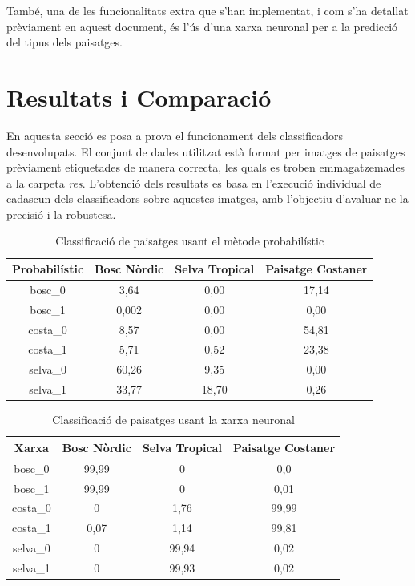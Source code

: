 \documentclass{ieeetj}
\begin{document}
També, una de les funcionalitats extra que s'han implementat, i com s'ha detallat prèviament en aquest document, és l'ús d'una xarxa neuronal per a la predicció del tipus dels paisatges.


\section{Resultats i Comparació} 
En aquesta secció es posa a prova el funcionament dels classificadors desenvolupats. El conjunt de dades utilitzat està format per imatges de paisatges prèviament etiquetades de manera correcta, les quals es troben emmagatzemades a la carpeta \textit{res}. L'obtenció dels resultats es basa en l'execució individual de cadascun dels classificadors sobre aquestes imatges, amb l'objectiu d'avaluar-ne la precisió i la robustesa.

\begin{table}[H]
\centering
\caption{Classificació de paisatges usant el mètode probabilístic}
\label{tab:clasificacion}
\begin{tabular}{|c|c|c|c|}
\hline
\textbf{Probabilístic} & \textbf{Bosc Nòrdic} & \textbf{Selva Tropical} & \textbf{Paisatge Costaner} \\
\hline
bosc\_0  & 3,64 & 0,00 & 17,14 \\
bosc\_1  & 0,002 & 0,00 & 0,00 \\
costa\_0 & 8,57 & 0,00 & 54,81 \\
costa\_1 & 5,71 & 0,52 & 23,38 \\
selva\_0 & 60,26 & 9,35 & 0,00 \\
selva\_1 & 33,77 & 18,70 & 0,26 \\
\hline
\end{tabular}
\end{table}


\begin{table}[H]
\centering
\caption{Classificació de paisatges usant la xarxa neuronal}
\label{tab:xarxa}
\begin{tabular}{|c|c|c|c|}
\hline
\textbf{Xarxa} & \textbf{Bosc Nòrdic} & \textbf{Selva Tropical} & \textbf{Paisatge Costaner} \\
\hline
bosc\_0  & 99,99 & 0     & 0,0  \\
bosc\_1  & 99,99 & 0     & 0,01  \\
costa\_0 & 0     & 1,76  & 99,99  \\
costa\_1 & 0,07  & 1,14  & 99,81 \\
selva\_0 & 0     & 99,94 & 0,02  \\
selva\_1 & 0     & 99,93 & 0,02  \\
\hline
\end{tabular}
\end{table}
\end{document}
